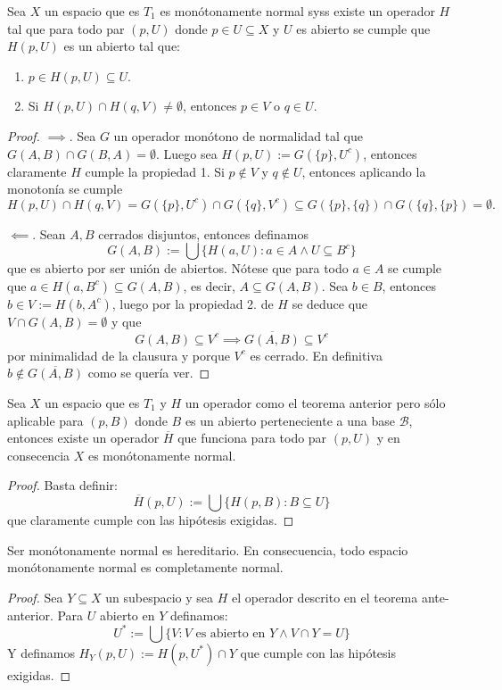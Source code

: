 \documentclass[topologia-analisis.tex]{subfiles}
\begin{document}
\begin{thm}
	Sea $X$ un espacio que es $T_1$ es monótonamente normal syss existe un operador $H$ tal que para
	todo par $(p, U)$ donde $p \in U \subseteq X$ y $U$ es abierto se cumple que $H(p, U)$ es un abierto tal que:
	\begin{enumerate}
		\item $p \in H(p, U) \subseteq U$.
		\item Si $H(p, U) \cap H(q, V) \ne \emptyset$, entonces $p \in V$ o $q \in U$.
	\end{enumerate}
\end{thm}
\begin{proof}
	$\implies$.
	Sea $G$ un operador monótono de normalidad tal que $G(A, B) \cap G(B, A) = \emptyset$.
	Luego sea $H(p, U) := G(\{p\}, U^c)$, entonces claramente $H$ cumple la propiedad 1.
	Si $p \notin V$ y $q \notin U$, entonces aplicando la monotonía se cumple
	$$ H(p, U) \cap H(q, V) = G(\{p\}, U^c) \cap G(\{q\}, V^c) \subseteq G(\{p\}, \{q\}) \cap G(\{q\}, \{p\}) = \emptyset. $$

	$\impliedby$. Sean $A, B$ cerrados disjuntos, entonces definamos
	$$ G(A, B) := \bigcup \{ H(a, U) : a\in A \wedge U \subseteq B^c \} $$
	que es abierto por ser unión de abiertos.
	Nótese que para todo $a\in A$ se cumple que $a \in H(a, B^c) \subseteq G(A, B)$, es decir, $A \subseteq G(A, B)$.
	Sea $b\in B$, entonces $b \in V := H(b, A^c)$, luego por la propiedad 2. de $H$ se deduce que $V \cap G(A, B) = \emptyset$ y que
	$$ G(A, B) \subseteq V^c \implies \overline{ G(A, B) } \subseteq V^c $$
	por minimalidad de la clausura y porque $V^c$ es cerrado.
	En definitiva $b \notin \overline{ G(A, B) }$ como se quería ver.
\end{proof}

\begin{prop}
	Sea $X$ un espacio que es $T_1$ y $H$ un operador como el teorema anterior pero sólo aplicable para $(p, B)$ donde $B$ es un abierto perteneciente
	a una base $\mathcal{B}$, entonces existe un operador $\overline H$ que funciona para todo par $(p, U)$ y en consecencia $X$ es monótonamente normal.
\end{prop}
\begin{proof}
	Basta definir:
	$$ \overline H(p, U) := \bigcup \{ H(p, B) : B\subseteq U \} $$
	que claramente cumple con las hipótesis exigidas.
\end{proof}

\begin{thmi}
	Ser monótonamente normal es hereditario.
	En consecuencia, todo espacio monótonamente normal es completamente normal.
\end{thmi}
\begin{proof}
	Sea $Y \subseteq X$ un subespacio y sea $H$ el operador descrito en el teorema ante-anterior.
	Para $U$ abierto en $Y$ definamos:
	$$ U^* := \bigcup\{ V : V\text{ es abierto en }Y \wedge V\cap Y = U \} $$
	Y definamos $H_Y(p, U) := H(p, U^*) \cap Y$ que cumple con las hipótesis exigidas.
\end{proof}
\end{document}
